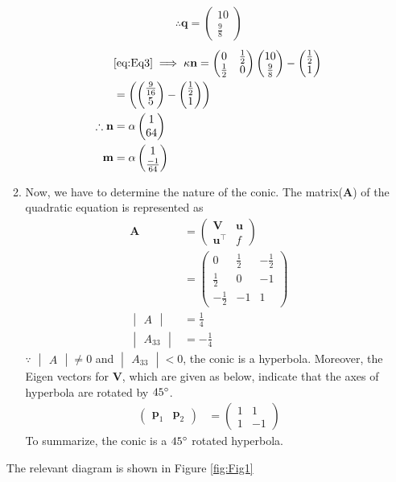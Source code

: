 \documentclass[12pt]{article}
\newcommand{\mydet}[1]{\ensuremath{\begin{vmatrix}#1\end{vmatrix}}}
\providecommand{\brak}[1]{\ensuremath{\left(#1\right)}}
\newcommand{\myvec}[1]{\ensuremath{\begin{pmatrix}#1\end{pmatrix}}}
\let\vec\mathbf
\begin{document}
\begin{enumerate}
\begin{enumerate}
\begin{align}
	 \therefore \vec{q} = \myvec{10 \\ \frac{9}{8}}
\end{align}
\begin{align}
	& \eqref{eq:Eq3} \implies  \kappa \vec{n} = \myvec{ 0 & \frac{1}{2} \\ \frac{1}{2} & 0} \myvec{10 \\ \frac{9}{8}}-\myvec{\frac{1}{2} \\ 1} \\  
	&= \brak{\myvec{ \frac{9}{16} \\ 5} - \myvec{\frac{1}{2} \\ 1}} \\
	\therefore \vec{n} &= \alpha\myvec{1 \\ 64}\\
	\vec{m} &= \alpha\myvec{1 \\ \frac{-1}{64}}
\end{align}
\item Now, we have to determine the nature of the conic. The matrix($\vec{A}$) of the quadratic equation is represented as
\begin{align}
         \vec{A} &= \myvec{\vec{V} & \vec{u} \\ \vec{u}^\top & f} \\
	 &= \myvec{0 & \frac{1}{2} & -\frac{1}{2} \\ 
	           \frac{1}{2} & 0 & -1   \\
		   -\frac{1}{2} & -1 & 1}  \\
	\mydet{A} &=  \frac{1}{4} \\ 
	\mydet{A_{33}} &= -\frac{1}{4} 
\end{align}
$\because$ $\mydet{A} \neq 0$ and $\mydet{A_{33}} < 0$, the conic is a hyperbola. Moreover, the Eigen vectors for $\vec{V}$, which are given as below, indicate that the axes of hyperbola are rotated by $45\degree$. 
\begin{align}
	\myvec{\vec{p}_1 & \vec{p}_2} &= \myvec{1 & 1 \\ 1 & -1}
\end{align}
To summarize, the conic is a $45\degree$ rotated hyperbola.
\end{enumerate}
The relevant diagram is shown in Figure \ref{fig:Fig1}
\begin{figure}[!h]
	\begin{center}

\end{center}
\end{figure}
\end{enumerate}
\end{document}
